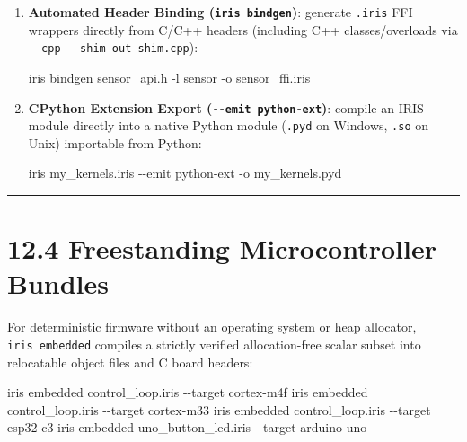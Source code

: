 \documentclass[
  english,
  oneside]{book}
\newenvironment{Shaded}{\begin{snugshade}}{\end{snugshade}}
\newcommand{\NormalTok}[1]{\textcolor[rgb]{0.83,0.83,0.83}{#1}}
\begin{document}
\begin{enumerate}
\def\labelenumi{\arabic{enumi}.}
\setcounter{enumi}{2}
\item
  \textbf{Automated Header Binding (\texttt{iris\ bindgen})}: generate
  \texttt{.iris} FFI wrappers directly from C/C++ headers (including C++
  classes/overloads via \texttt{-\/-cpp\ -\/-shim-out\ shim.cpp}):

\begin{Shaded}
\begin{Highlighting}[]
\NormalTok{iris bindgen sensor\_api.h {-}l sensor {-}o sensor\_ffi.iris}
\end{Highlighting}
\end{Shaded}
\item
  \textbf{CPython Extension Export (\texttt{-\/-emit\ python-ext})}:
  compile an IRIS module directly into a native Python module
  (\texttt{.pyd} on Windows, \texttt{.so} on Unix) importable from
  Python:

\begin{Shaded}
\begin{Highlighting}[]
\NormalTok{iris my\_kernels.iris {-}{-}emit python{-}ext {-}o my\_kernels.pyd}
\end{Highlighting}
\end{Shaded}
\end{enumerate}

\begin{center}\rule{0.5\linewidth}{0.5pt}\end{center}

\section{12.4 Freestanding Microcontroller
Bundles}\label{freestanding-microcontroller-bundles}

For deterministic firmware without an operating system or heap
allocator, \texttt{iris\ embedded} compiles a strictly verified
allocation-free scalar subset into relocatable object files and C board
headers:

\begin{Shaded}
\begin{Highlighting}[]
\NormalTok{iris embedded control\_loop.iris {-}{-}target cortex{-}m4f}
\NormalTok{iris embedded control\_loop.iris {-}{-}target cortex{-}m33}
\NormalTok{iris embedded control\_loop.iris {-}{-}target esp32{-}c3}
\NormalTok{iris embedded uno\_button\_led.iris {-}{-}target arduino{-}uno}
\end{Highlighting}
\end{Shaded}
\end{document}
